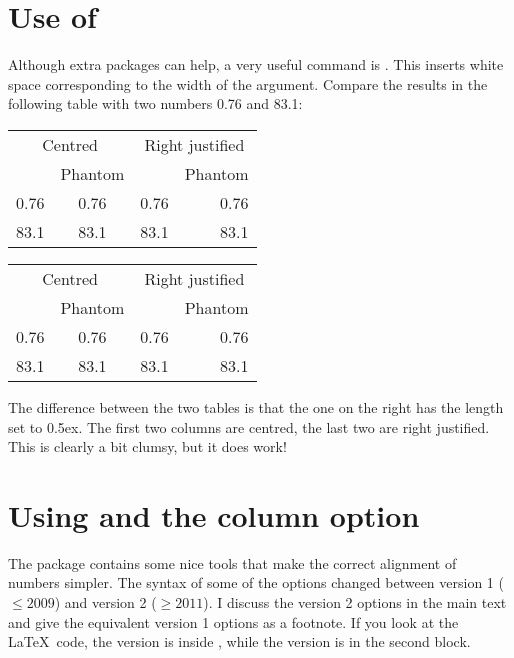 \section{Use of }
\label{sec:table:phantom}

Although extra packages can help, a very useful command is
. This inserts white space corresponding to the width
of the argument. Compare the results in the following table with two
numbers 0.76 and 83.1:

\begin{center}
\begin{tabular}{cc|rr}
  \multicolumn{2}{c|}{Centred} &
  \multicolumn{2}{c}{Right justified} \\
  & Phantom & & Phantom\\\hline
  0.76 & \phantom{0}0.76 & 0.76 & 0.76\\
  83.1 & 83.1\phantom{0} & 83.1 & 83.1\phantom{0}
\end{tabular}
\qquad
{\setlength{\extrarowheight}{0.5ex}
\begin{tabular}{cc|rr}
  \multicolumn{2}{c|}{Centred} &
  \multicolumn{2}{c}{Right justified} \\
  & Phantom & & Phantom\\\hline
  0.76 & \phantom{0}0.76 & 0.76 & 0.76\\
  83.1 & 83.1\phantom{0} & 83.1 & 83.1\phantom{0}
\end{tabular}
}
\end{center}
\par\noindent
The difference between the two tables is that the one on the right
has the length  set to 0.5ex.  The first two
columns are centred, the last two are right justified.  This is
clearly a bit clumsy, but it does work!


\section{Using  and the  column option}
\label{sec:table:siunitx}

The  package contains some nice tools that make the
correct alignment of numbers simpler. The syntax of some of the
options changed between version 1 ($\leq 2009$) and version 2 ($\geq 2011$). I
discuss the version 2 options in the main text and give the equivalent
version 1 options as a footnote. If you look at the \LaTeX\ code, the
 version is inside , while the  version is in the second
block.

